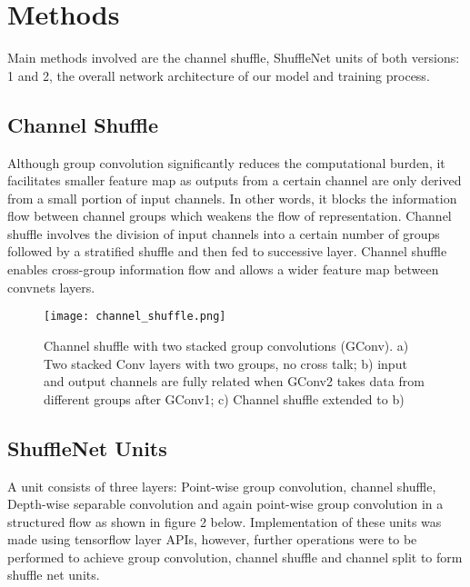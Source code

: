 \documentclass{article}
\begin{document}
\newpage

\section{Methods}
Main methods involved are the channel shuffle, ShuffleNet units of both versions: 1 and 2, the overall network architecture of our model and training process.

\subsection{Channel Shuffle}
Although group convolution significantly reduces the computational burden, it facilitates smaller feature map as outputs from a certain channel are only derived from a small portion of input channels. In other words, it blocks the information flow between channel groups which weakens the flow of representation. Channel shuffle involves the division of input channels into a certain number of groups followed by a stratified shuffle and then fed to successive layer. Channel shuffle enables cross-group information flow and allows a wider feature map between convnets layers.

\begin{figure}[H]
    \centering
    \texttt{[image: channel\_shuffle.png]}
    \caption{Channel shuffle with two stacked group convolutions (GConv). a) Two stacked Conv layers with two groups, no cross talk; b) input and output channels are fully related when GConv2 takes data from different groups after GConv1; c) Channel shuffle extended to b) } %
\end{figure}

\subsection{ShuffleNet Units}
A unit consists of three layers: Point-wise group convolution, channel shuffle, Depth-wise separable convolution and again point-wise group convolution in a structured flow as shown in figure 2 below. Implementation of these units was made using tensorflow layer APIs, however, further operations were to be performed to achieve group convolution, channel shuffle and channel split to form shuffle net units. 
\newline
\end{document}

